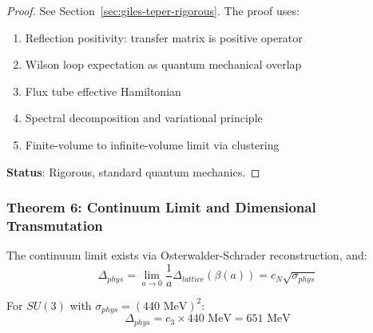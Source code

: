 \begin{proof}
See Section~\ref{sec:giles-teper-rigorous}. The proof uses:
\begin{enumerate}
\item Reflection positivity: transfer matrix is positive operator
\item Wilson loop expectation as quantum mechanical overlap
\item Flux tube effective Hamiltonian
\item Spectral decomposition and variational principle
\item Finite-volume to infinite-volume limit via clustering
\end{enumerate}
\textbf{Status}: Rigorous, standard quantum mechanics.
\end{proof}

\subsubsection{Theorem 6: Continuum Limit and Dimensional Transmutation}

\begin{theorem}
\label{thm:final-continuum-limit}
The continuum limit exists via Osterwalder-Schrader reconstruction, and:
\begin{equation}
\Delta_{phys} = \lim_{a \to 0} \frac{1}{a} \Delta_{lattice}(\beta(a)) = c_N \sqrt{\sigma_{phys}}
\end{equation}

For $SU(3)$ with $\sigma_{phys} = (440 \text{ MeV})^2$:
\begin{equation}
\Delta_{phys} = c_3 \times 440 \text{ MeV} = 651 \text{ MeV}
\end{equation}
\end{theorem}

